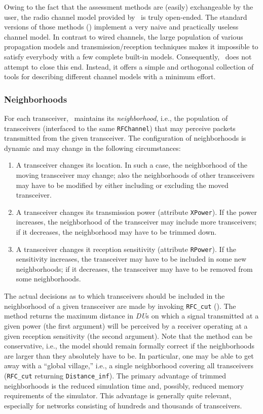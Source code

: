 Owing to the fact that the assessment methods are (easily) exchangeable by the
user, the radio channel model provided by \smurph\ is truly open-ended.
The standard versions of those methods ()
implement a very naive and practically useless channel model.
In contrast to wired channels, the large population of various propagation
models and transmission/reception techniques
makes it impossible to satisfy everybody with a few complete built-in models.
Consequently, \smurph\ does not attempt to close this end.
Instead, it offers a simple and orthogonal collection of tools for
describing different channel models with a minimum effort.

\subsubsection{Neighborhoods}
\label{rm_tr_ra_ne}

For each transceiver, \smurph\ maintains its {\em neighborhood}, i.e., the
population of transceivers (interfaced to the same {\tt RFChannel}) that may
perceive packets transmitted from the given transceiver.
The configuration of neighborhoods is dynamic and may change in the following
circumstances:

\begin{enumerate}
\item
A transceiver changes its location.
In such a case, the neighborhood of the moving transceiver may change; also
the neighborhoods of other transceivers may have to be modified by either
including or excluding the moved transceiver.
\item
A transceiver changes its transmission power (attribute {\tt XPower}).
If the power increases, the neighborhood of the transceiver may include more
transceivers; if it decreases, the neighborhood may have to be trimmed down.
\item
A transceiver changes it reception sensitivity (attribute {\tt RPower}).
If the sensitivity increases, the transceiver may have to be included in some
new neighborhoods; if it decreases, the transceiver may have to be removed
from some neighborhoods.
\end{enumerate}

The actual decisions as to which transceivers should be included in the
neighborhood of a given transceiver are made by invoking {\tt RFC\_cut}
().
The method returns the maximum distance in {\em DU\/}s on which a signal
transmitted at a given power (the first argument) will be perceived by
a receiver operating at a given reception sensitivity (the second argument).
Note that the method can be conservative, i.e., the model should remain 
formally correct if the neighborhoods are larger than they absolutely have
to be.
In particular, one may be able to get away with a ``global village,'' i.e.,
a single neighborhood covering all transceivers ({\tt RFC\_cut} returning
{\tt Distance\_inf}).
The primary advantage of trimmed neighborhoods is the reduced simulation time
and, possibly, reduced memory requirements of the simulator.
This advantage is generally quite relevant, especially for networks consisting
of hundreds and thousands of transceivers.

